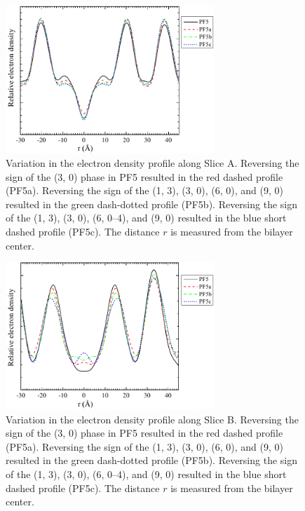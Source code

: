 \begin{figure}[htbp]
  \centering
  \includegraphics[width=0.7\textwidth]{figures/ripple/LAXS/major_phase_variation}
  \caption{Variation in the electron density profile along Slice A. 
  Reversing the sign of the (3, 0) phase in PF5 
  resulted in the red dashed profile (PF5a). Reversing the sign of the 
  (1, 3), (3, 0), (6, 0), and (9, 0) resulted in the green dash-dotted profile
  (PF5b). Reversing the sign of the (1, 3), (3, 0), (6, 0--4), and (9, 0)
  resulted in the blue short dashed profile (PF5c). 
  The distance $r$ is measured from the bilayer center.}
  \label{fig:major_phase_variation}
\end{figure}

\begin{figure}[htbp]
  \centering
  \includegraphics[width=0.7\textwidth]{figures/ripple/LAXS/minor_phase_variation}
  \caption{Variation in the electron density profile along Slice B.
  Reversing the sign of the (3, 0) phase in PF5 
  resulted in the red dashed profile (PF5a). Reversing the sign of the 
  (1, 3), (3, 0), (6, 0), and (9, 0) resulted in the green dash-dotted profile
  (PF5b). Reversing the sign of the (1, 3), (3, 0), (6, 0--4), and (9, 0)
  resulted in the blue short dashed profile (PF5c). 
  The distance $r$ is measured from the bilayer center.}
  \label{fig:minor_phase_variation}
\end{figure}

